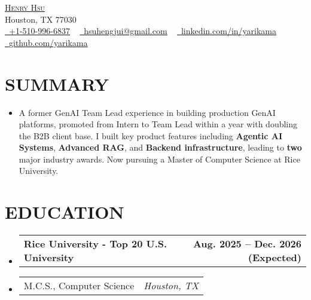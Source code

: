 \documentclass[letterpaper,11pt]{article}
\makeatletter
\newcommand{\mylocation}{
  Houston, TX 77030
}
\newcommand{\resumeSubheadingnull}[2]{
  \item
    \begin{tabular*}{1.0\textwidth}[t]{l@{\extracolsep{\fill}}r}
      \textbf{#1} & \textbf{\small #2} \\
    \end{tabular*}\vspace{3pt}
}
\newcommand{\resumeSubItema}[2]{
  \item
    \begin{tabular*}{1.0\textwidth}[t]{l@{\extracolsep{\fill}}r}
      \small#1 & \textit{\small #2} \\
    \end{tabular*}
}
\newcommand{\resumeSubHeadingListStart}{\begin{itemize}[leftmargin=0.0in, label={}]}
\newcommand{\resumeSubHeadingListEnd}{\end{itemize}}
\makeatother
\begin{document}

\begin{center}
	{\Huge \scshape \href{https://yarikama.world}{Henry Hsu}} \\
    {\small\color{gray} \mylocation} \\
	\href{tel:+1-510-996-6837}{\raisebox{-0.2\height}\faPhone\  \underline{+1-510-996-6837}} ~
	\href{mailto:hsuhengjui@gmail.com}{\raisebox{-0.2\height}\faEnvelope\  \underline{hsuhengjui@gmail.com}} ~
	\href{https://linkedin.com/in/yarikama/}{\raisebox{-0.2\height}\faLinkedin\ \underline{linkedin.com/in/yarikama}}  ~
	\href{https://github.com/yarikama}{\raisebox{-0.2\height}\faGithub\ \underline{github.com/yarikama}}
	\vspace{-8pt}
\end{center}

\section{SUMMARY}
\resumeSubHeadingListStart
\item\small{A former GenAI Team Lead experience in building production GenAI platforms, promoted from Intern to Team Lead within a year with doubling the B2B client base. I built key product features including \textbf{Agentic AI Systems}, \textbf{Advanced RAG}, and \textbf{Backend infrastructure}, leading to \textbf{two} major industry awards. Now pursuing a Master of Computer Science at Rice University.}
\vspace{-2pt}
\resumeSubHeadingListEnd


\section{EDUCATION}
\resumeSubHeadingListStart
\resumeSubheadingnull
{Rice University - Top 20 U.S. University}{Aug. 2025 -- Dec. 2026 (Expected)}{}{}
\vspace{-20pt}
\resumeSubItema{M.C.S., Computer Science}{Houston, TX}
\vspace{-17pt}
\resumeSubHeadingListEnd
\end{document}
